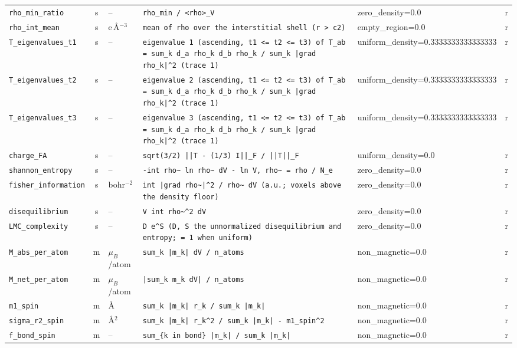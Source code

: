 \begin{table}[p]
\begin{tabular}{p{3.3cm}cp{1.4cm}p{6.6cm}p{2.3cm}c}
\texttt{rho\_min\_ratio} & s & -- & \texttt{rho\_min / <rho>\_V} & zero\_density=0.0 & r \\
\texttt{rho\_int\_mean} & s & e\,\AA$^{-3}$ & \texttt{mean of rho over the interstitial shell (r > c2)} & empty\_region=0.0 & r \\
\texttt{T\_eigenvalues\_t1} & s & -- & \texttt{eigenvalue 1 (ascending, t1 <= t2 <= t3) of T\_ab = sum\_k d\_a rho\_k d\_b rho\_k / sum\_k |grad rho\_k|\^{}2 (trace 1)} & uniform\_density=0.3333333333333333 & r \\
\texttt{T\_eigenvalues\_t2} & s & -- & \texttt{eigenvalue 2 (ascending, t1 <= t2 <= t3) of T\_ab = sum\_k d\_a rho\_k d\_b rho\_k / sum\_k |grad rho\_k|\^{}2 (trace 1)} & uniform\_density=0.3333333333333333 & r \\
\texttt{T\_eigenvalues\_t3} & s & -- & \texttt{eigenvalue 3 (ascending, t1 <= t2 <= t3) of T\_ab = sum\_k d\_a rho\_k d\_b rho\_k / sum\_k |grad rho\_k|\^{}2 (trace 1)} & uniform\_density=0.3333333333333333 & r \\
\texttt{charge\_FA} & s & -- & \texttt{sqrt(3/2) ||T - (1/3) I||\_F / ||T||\_F} & uniform\_density=0.0 & r \\
\texttt{shannon\_entropy} & s & -- & \texttt{-int rho\~{} ln rho\~{} dV - ln V,  rho\~{} = rho / N\_e} & zero\_density=0.0 & r \\
\texttt{fisher\_information} & s & bohr$^{-2}$ & \texttt{int |grad rho\~{}|\^{}2 / rho\~{} dV  (a.u.; voxels above the density floor)} & zero\_density=0.0 & r \\
\texttt{disequilibrium} & s & -- & \texttt{V int rho\~{}\^{}2 dV} & zero\_density=0.0 & r \\
\texttt{LMC\_complexity} & s & -- & \texttt{D e\^{}S  (D, S the unnormalized disequilibrium and entropy; = 1 when uniform)} & zero\_density=0.0 & r \\
\texttt{M\_abs\_per\_atom} & m & $\mu_B$/atom & \texttt{sum\_k |m\_k| dV / n\_atoms} & non\_magnetic=0.0 & r \\
\texttt{M\_net\_per\_atom} & m & $\mu_B$/atom & \texttt{|sum\_k m\_k dV| / n\_atoms} & non\_magnetic=0.0 & r \\
\texttt{m1\_spin} & m & \AA & \texttt{sum\_k |m\_k| r\_k / sum\_k |m\_k|} & non\_magnetic=0.0 & r \\
\texttt{sigma\_r2\_spin} & m & \AA$^2$ & \texttt{sum\_k |m\_k| r\_k\^{}2 / sum\_k |m\_k| - m1\_spin\^{}2} & non\_magnetic=0.0 & r \\
\texttt{f\_bond\_spin} & m & -- & \texttt{sum\_\{k in bond\} |m\_k| / sum\_k |m\_k|} & non\_magnetic=0.0 & r \\

\end{tabular}
\end{table}

